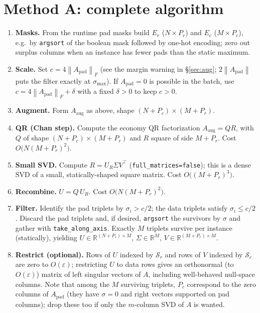 \documentclass[11pt]{article}
\newcommand{\R}{\mathbb{R}}
\newcommand{\Apad}{A_{\mathrm{pad}}}
\newcommand{\Aaug}{A_{\mathrm{aug}}}
\newcommand{\norm}[1]{\left\lVert #1 \right\rVert}
\begin{document}
\section{Method A: complete algorithm}\label{sec:aug-alg}

\begin{enumerate}[label=\textbf{Step \arabic*.}, leftmargin=2.2cm, itemsep=3pt]
  \item \textbf{Masks.} From the runtime pad masks build $E_r$ ($N \times P_r$)
        and $E_c$ ($M \times P_c$), e.g.\ by \texttt{argsort} of the boolean mask
        followed by one-hot encoding; zero out surplus columns when an instance
        has fewer pads than the static maximum.
  \item \textbf{Scale.} Set $c = 4\norm{\Apad}_F$ (see the margin warning in
        \S\ref{sec:aug}; $2\norm{\Apad}$ puts the filter exactly at
        $\sigma_{\max}$). If $\Apad = 0$ is possible in the batch, use
        $c = 4\norm{\Apad}_F + \delta$ with a fixed $\delta > 0$ to keep $c > 0$.
  \item \textbf{Augment.} Form $\Aaug$ as above,
        shape $(N + P_c) \times (M + P_r)$.
  \item \textbf{QR (Chan step).} Compute the economy QR factorization
        $\Aaug = QR$, with $Q$ of shape $(N+P_c) \times (M+P_r)$ and $R$ square
        of side $M + P_r$. Cost $O\!\big(N (M{+}P_r)^2\big)$.
  \item \textbf{Small SVD.} Compute $R = U_R \Sigma V^{\top}$
        (\texttt{full\_matrices=false}); this is a dense SVD of a small,
        statically-shaped square matrix. Cost $O\!\big((M{+}P_r)^3\big)$.
  \item \textbf{Recombine.} $U = Q\,U_R$. Cost $O\!\big(N (M{+}P_r)^2\big)$.
  \item \textbf{Filter.} Identify the pad triplets by $\sigma_i > c/2$; the data
        triplets satisfy $\sigma_i \le c/2$. Discard the pad triplets and, if
        desired, \texttt{argsort} the survivors by $\sigma$ and gather with
        \texttt{take\_along\_axis}. Exactly $M$ triplets survive per instance
        (statically), yielding $U \in \R^{(N+P_c) \times M}$,
        $\Sigma \in \R^{M}$, $V \in \R^{(M+P_r) \times M}$.
  \item \textbf{Restrict (optional).} Rows of $U$ indexed by $\mathcal{S}_r$ and
        rows of $V$ indexed by $\mathcal{S}_c$ are zero to $O(\varepsilon)$;
        restricting $U$ to data rows gives an orthonormal (to $O(\varepsilon)$)
        matrix of left singular vectors of $A$, including well-behaved null-space
        columns. Note that among the $M$ surviving triplets, $P_c$ correspond to
        the zero columns of $\Apad$ (they have $\sigma = 0$ and right vectors
        supported on pad columns); drop these too if only the $m$-column SVD of
        $A$ is wanted.
\end{enumerate}
\end{document}
